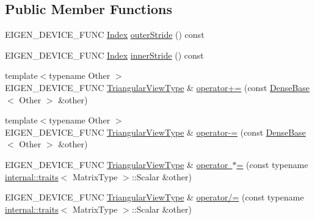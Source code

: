 \subsection*{Public Member Functions}
\begin{DoxyCompactItemize}
\item 
E\+I\+G\+E\+N\+\_\+\+D\+E\+V\+I\+C\+E\+\_\+\+F\+U\+NC \mbox{\hyperlink{struct_eigen_1_1_eigen_base_a554f30542cc2316add4b1ea0a492ff02}{Index}} \mbox{\hyperlink{class_eigen_1_1_triangular_view_impl_3_01___matrix_type_00_01___mode_00_01_dense_01_4_added5657459878085cb95d5052b1dd14}{outer\+Stride}} () const
\item 
E\+I\+G\+E\+N\+\_\+\+D\+E\+V\+I\+C\+E\+\_\+\+F\+U\+NC \mbox{\hyperlink{struct_eigen_1_1_eigen_base_a554f30542cc2316add4b1ea0a492ff02}{Index}} \mbox{\hyperlink{class_eigen_1_1_triangular_view_impl_3_01___matrix_type_00_01___mode_00_01_dense_01_4_aff17b6873e916ed22b8aadc14c2b1df9}{inner\+Stride}} () const
\item 
{\footnotesize template$<$typename Other $>$ }\\E\+I\+G\+E\+N\+\_\+\+D\+E\+V\+I\+C\+E\+\_\+\+F\+U\+NC \mbox{\hyperlink{class_eigen_1_1_triangular_view}{Triangular\+View\+Type}} \& \mbox{\hyperlink{class_eigen_1_1_triangular_view_impl_3_01___matrix_type_00_01___mode_00_01_dense_01_4_ab6fa10c605bc81813d6a4ab243bb54b1}{operator+=}} (const \mbox{\hyperlink{class_eigen_1_1_dense_base}{Dense\+Base}}$<$ Other $>$ \&other)
\item 
{\footnotesize template$<$typename Other $>$ }\\E\+I\+G\+E\+N\+\_\+\+D\+E\+V\+I\+C\+E\+\_\+\+F\+U\+NC \mbox{\hyperlink{class_eigen_1_1_triangular_view}{Triangular\+View\+Type}} \& \mbox{\hyperlink{class_eigen_1_1_triangular_view_impl_3_01___matrix_type_00_01___mode_00_01_dense_01_4_a9cc4a65490e86eb0cc0d7f764782eeb6}{operator-\/=}} (const \mbox{\hyperlink{class_eigen_1_1_dense_base}{Dense\+Base}}$<$ Other $>$ \&other)
\item 
E\+I\+G\+E\+N\+\_\+\+D\+E\+V\+I\+C\+E\+\_\+\+F\+U\+NC \mbox{\hyperlink{class_eigen_1_1_triangular_view}{Triangular\+View\+Type}} \& \mbox{\hyperlink{class_eigen_1_1_triangular_view_impl_3_01___matrix_type_00_01___mode_00_01_dense_01_4_a77a5453b5b49ca309629f6888da37b44}{operator $\ast$=}} (const typename \mbox{\hyperlink{struct_eigen_1_1internal_1_1traits}{internal\+::traits}}$<$ Matrix\+Type $>$\+::Scalar \&other)
\item 
E\+I\+G\+E\+N\+\_\+\+D\+E\+V\+I\+C\+E\+\_\+\+F\+U\+NC \mbox{\hyperlink{class_eigen_1_1_triangular_view}{Triangular\+View\+Type}} \& \mbox{\hyperlink{class_eigen_1_1_triangular_view_impl_3_01___matrix_type_00_01___mode_00_01_dense_01_4_a3bcca994aae11aeef15acb734f9a1a3f}{operator/=}} (const typename \mbox{\hyperlink{struct_eigen_1_1internal_1_1traits}{internal\+::traits}}$<$ Matrix\+Type $>$\+::Scalar \&other)

\end{DoxyCompactItemize}
